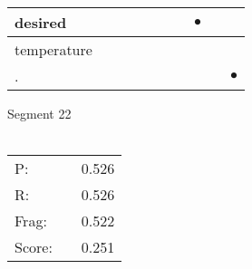 \documentclass[landscape]{article}
\newcommand{\ssp}{\hspace{2pt}}
\newcommand{\mex}{\cellcolor{g}$\bullet$}
\begin{document}
\begin{tabular}{|l|p{10pt}|p{10pt}|p{10pt}|p{10pt}|p{10pt}|p{10pt}|p{10pt}|p{10pt}|p{10pt}|}
\hline
\ssp \cellcolor{ref6}desired \ssp&\hspace{2pt}&\hspace{2pt}&\hspace{2pt}&\hspace{2pt}&\hspace{2pt}&\hspace{2pt}&\hspace{2pt}\mex&\hspace{2pt}&\hspace{2pt}\\
\hline
\ssp temperature \ssp&\hspace{2pt}&\hspace{2pt}&\hspace{2pt}&\hspace{2pt}&\hspace{2pt}&\hspace{2pt}&\hspace{2pt}&\hspace{2pt}&\hspace{2pt}\\
\hline
\ssp \cellcolor{ref8}. \ssp&\hspace{2pt}&\hspace{2pt}&\hspace{2pt}&\hspace{2pt}&\hspace{2pt}&\hspace{2pt}&\hspace{2pt}&\hspace{2pt}&\hspace{2pt}\mex\\
\hline
\end{tabular}

\vspace{6pt}
\noindent Segment 22\\\\
\noindent\begin{tabular}{lm{12pt}r}
\hline
P:&&0.526\\
R:&&0.526\\
Frag:&&0.522\\
Score:&&0.251\\
\end{tabular}

\newpage
\end{document}
